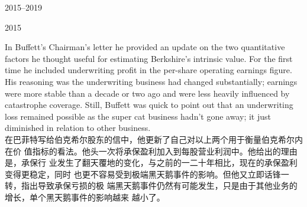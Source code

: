 \begin{chapter}{2015--2019}
\begin{section}{2015}
\begin{verseparallel}
  {
    In Buffett's Chairman's letter he provided an update on the two quantitative
    factors he thought useful for estimating Berkshire's intrinsic value. For
    the first time he included underwriting profit in the per-share operating
    earnings figure.  His
    reasoning was the underwriting business had changed substantially; earnings
    were more stable than a decade or two ago and were less heavily influenced
    by catastrophe coverage. Still, Buffett was quick to point out that an
    underwriting loss remained possible as the super cat
    business hadn't gone away; it just diminished in relation to other business. \\
  }
  {
    在巴菲特写给伯克希尔股东的信中，他更新了自己对以上两个用于衡量伯克希尔内在价
    值指标的看法。他头一次将承保盈利加入到每股营业利润中。他给出的理由是，承保行
    业发生了翻天覆地的变化，与之前的一二十年相比，现在的承保盈利变得更稳定，同时
    也更不容易受到极端黑天鹅事件的影响。但他又立即话锋一转，指出导致承保亏损的极
    端黑天鹅事件仍然有可能发生，只是由于其他业务的增长，单个黑天鹅事件的影响越来
    越小了。
  }
\end{verseparallel}


\end{section}
\end{chapter}
